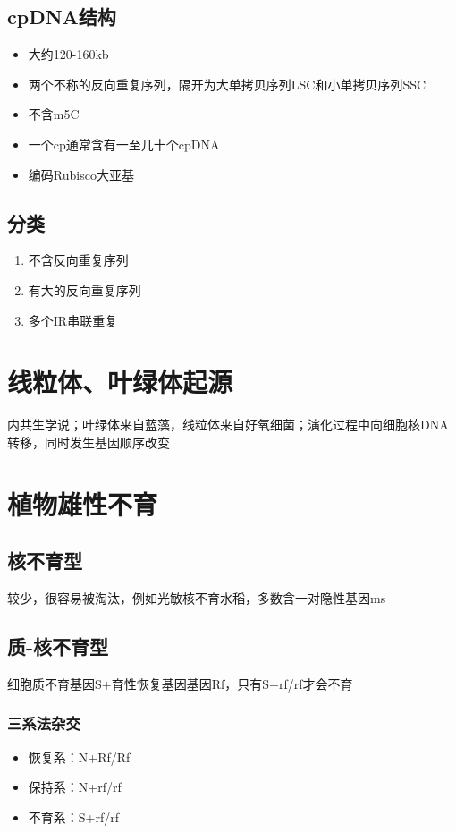 \documentclass[a4paper, 12pt]{report}
\begin{document}
  \subsection{cpDNA结构}
  \begin{itemize}
    \item 大约120-160kb
    \item 两个不称的反向重复序列，隔开为大单拷贝序列LSC和小单拷贝序列SSC
    \item 不含m5C
    \item 一个cp通常含有一至几十个cpDNA
    \item 编码Rubisco大亚基
  \end{itemize}
  \subsection{分类}
  \begin{enumerate}
    \item 不含反向重复序列
    \item 有大的反向重复序列
    \item 多个IR串联重复
  \end{enumerate}
  \section{线粒体、叶绿体起源}
  内共生学说；叶绿体来自蓝藻，线粒体来自好氧细菌；演化过程中向细胞核DNA转移，同时发生基因顺序改变
  \section{植物雄性不育}
  \subsection{核不育型}
  较少，很容易被淘汰，例如光敏核不育水稻，多数含一对隐性基因ms
  \subsection{质-核不育型}
  细胞质不育基因S+育性恢复基因基因Rf，只有S+rf/rf才会不育
  \subsubsection{三系法杂交}
  \begin{itemize}
    \item 恢复系：N+Rf/Rf
    \item 保持系：N+rf/rf
    \item 不育系：S+rf/rf
  \end{itemize}
\end{document}
